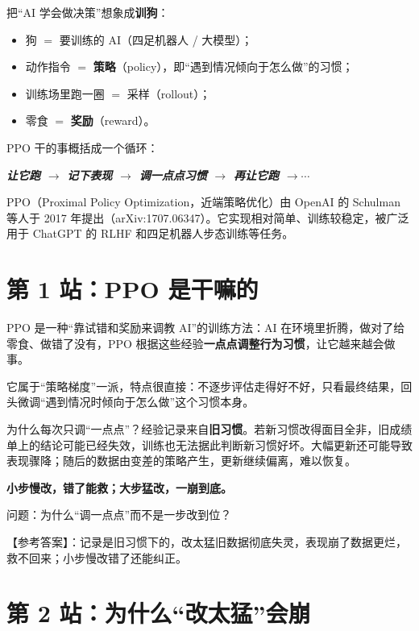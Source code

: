 \documentclass[UTF8,12pt,a4paper]{ctexrep}
\newcommand{\plain}[1]{\begin{plainbox}#1\end{plainbox}}
\newcommand{\pin}[1]{\begin{pinbox}#1\end{pinbox}}
\newcommand{\selfcheck}[1]{\begin{checkb}#1\end{checkb}}
\newcommand{\flow}[1]{\par\medskip\noindent
  \begin{tcolorbox}[colback=main!6,colframe=main!6,boxrule=0pt,arc=2pt,
    left=8pt,right=8pt,top=5pt,bottom=5pt,halign=center,
    before skip=8pt,after skip=8pt]
    \color{main!85!black}\bfseries #1
  \end{tcolorbox}\par\medskip}
\begin{document}
把``AI 学会做决策''想象成\textbf{训狗}：

\begin{itemize}[nosep]
  \item 狗 $=$ 要训练的 AI（四足机器人 / 大模型）；
  \item 动作指令 $=$ \textbf{策略}（policy），即``遇到情况倾向于怎么做''的习惯；
  \item 训练场里跑一圈 $=$ 采样（rollout）；
  \item 零食 $=$ \textbf{奖励}（reward）。
\end{itemize}

PPO 干的事概括成一个循环：

\flow{\emph{让它跑 $\to$ 记下表现 $\to$ 调一点点习惯 $\to$ 再让它跑 $\to \cdots$}}

PPO（Proximal Policy Optimization，近端策略优化）由 OpenAI 的 Schulman 等人于 2017 年提出（arXiv:1707.06347）。它实现相对简单、训练较稳定，被广泛用于 ChatGPT 的 RLHF 和四足机器人步态训练等任务。

\section{第 1 站：PPO 是干嘛的}

PPO 是一种``靠试错和奖励来调教 AI''的训练方法：AI 在环境里折腾，做对了给零食、做错了没有，PPO 根据这些经验\textbf{一点点调整行为习惯}，让它越来越会做事。

它属于``策略梯度''一派，特点很直接：不逐步评估走得好不好，只看最终结果，回头微调``遇到情况时倾向于怎么做''这个习惯本身。

\plain{为什么每次只调``一点点''？经验记录来自\textbf{旧习惯}。若新习惯改得面目全非，旧成绩单上的结论可能已经失效，训练也无法据此判断新习惯好坏。大幅更新还可能导致表现骤降；随后的数据由变差的策略产生，更新继续偏离，难以恢复。}

\pin{\textbf{小步慢改，错了能救；大步猛改，一崩到底。}}

\selfcheck{问题：为什么``调一点点''而不是一步改到位？

\noindent【参考答案】：记录是旧习惯下的，改太猛旧数据彻底失灵，表现崩了数据更烂，救不回来；小步慢改错了还能纠正。}

\section{第 2 站：为什么``改太猛''会崩}
\end{document}
